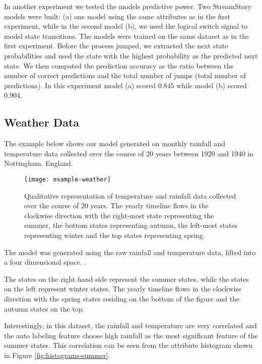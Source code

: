 In another experiment we tested the models predictive power. Two StreamStory models were built: (a) one 
model using the same attributes as in the first experiment, while in the second model (b), we used
the logical switch signal to model state transitions. The models were trained on the same dataset
as in the first experiment. Before the process jumped, we extracted the next state probabilities
and used the state with the highest probability as the predicted next state. We then computed
the prediction accuracy as the ratio between the number of correct predictions and the total number
of jumps (total number of predictions). In this experiment model (a) scored $0.845$ while model
(b) scored $0.904$.


\subsection{Weather Data}
\label{sec:experiments-weather}

The example below shows our model generated on monthly rainfall and temperature data
collected over the course of 20 years between 1920 and 1940 in Nottingham, England.

\begin{figure}[h!]
	\centering
	\texttt{[image: example-weather]}
	\caption{Qualitative representation of temperature and rainfall data collected over the course of 20 years. The yearly timeline flows in the clockwise direction with the right-most state representing the summer, the bottom states representing autumn, the left-most states representing winter and the top states representing spring.}
	\label{fig:example-weather}
\end{figure}

The model was generated using the raw rainfall and temperature data, lifted into a four dimensional space.
.

The states on the right hand side represent the 
summer states, while the states on the left represent winter states. The yearly timeline flows in the clockwise direction with the spring states residing on the bottom of the figure and the autumn
states on the top.

Interestingly, in this dataset, the rainfall and temperature are very correlated and the auto labeling feature
choose high rainfall as the most significant feature of the summer states. This correlation can be seen
from the attribute histogram shown in Figure \ref{fig:histograms-summer}.

